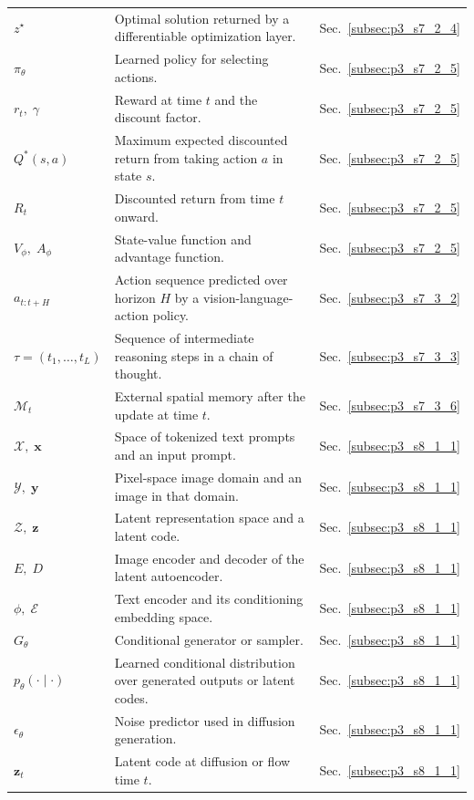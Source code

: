 \begin{longtable}{lll}
$z^\star$ & Optimal solution returned by a differentiable optimization layer. & Sec.~\ref{subsec:p3_s7_2_4} \\
$\pi_\theta$ & Learned policy for selecting actions. & Sec.~\ref{subsec:p3_s7_2_5} \\
$r_t,\;\gamma$ & Reward at time $t$ and the discount factor. & Sec.~\ref{subsec:p3_s7_2_5} \\
$Q^*(s,a)$ & Maximum expected discounted return from taking action $a$ in state $s$. & Sec.~\ref{subsec:p3_s7_2_5} \\
$R_t$ & Discounted return from time $t$ onward. & Sec.~\ref{subsec:p3_s7_2_5} \\
$V_\phi,\;A_\phi$ & State-value function and advantage function. & Sec.~\ref{subsec:p3_s7_2_5} \\
$a_{t:t+H}$ & Action sequence predicted over horizon $H$ by a vision-language-action policy. & Sec.~\ref{subsec:p3_s7_3_2} \\
$\tau=(t_1,\ldots,t_L)$ & Sequence of intermediate reasoning steps in a chain of thought. & Sec.~\ref{subsec:p3_s7_3_3} \\
$\mathcal{M}_t$ & External spatial memory after the update at time $t$. & Sec.~\ref{subsec:p3_s7_3_6} \\
$\mathcal{X},\;\mathbf{x}$ & Space of tokenized text prompts and an input prompt. & Sec.~\ref{subsec:p3_s8_1_1} \\
$\mathcal{Y},\;\mathbf{y}$ & Pixel-space image domain and an image in that domain. & Sec.~\ref{subsec:p3_s8_1_1} \\
$\mathcal{Z},\;\mathbf{z}$ & Latent representation space and a latent code. & Sec.~\ref{subsec:p3_s8_1_1} \\
$E,\;D$ & Image encoder and decoder of the latent autoencoder. & Sec.~\ref{subsec:p3_s8_1_1} \\
$\phi,\;\mathcal{E}$ & Text encoder and its conditioning embedding space. & Sec.~\ref{subsec:p3_s8_1_1} \\
$G_\theta$ & Conditional generator or sampler. & Sec.~\ref{subsec:p3_s8_1_1} \\
$p_\theta(\cdot\mid\cdot)$ & Learned conditional distribution over generated outputs or latent codes. & Sec.~\ref{subsec:p3_s8_1_1} \\
$\epsilon_\theta$ & Noise predictor used in diffusion generation. & Sec.~\ref{subsec:p3_s8_1_1} \\
$\mathbf{z}_t$ & Latent code at diffusion or flow time $t$. & Sec.~\ref{subsec:p3_s8_1_1} \\

\end{longtable}
